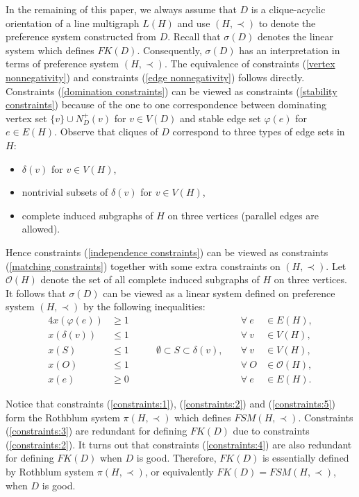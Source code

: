 \documentclass[11pt]{article}
\numberwithin{theorem}{section}
\begin{document}
In the remaining of this paper, we always assume that $D$ is a clique-acyclic orientation of a line multigraph $L(H)$ and use $(H,\prec)$ to denote the preference system constructed from $D$. Recall that $\sigma(D)$ denotes the linear system which defines $FK(D)$. Consequently, $\sigma(D)$ has an interpretation in terms of preference system $(H,\prec)$. The equivalence of constraints (\ref{vertex nonnegativity}) and constraints (\ref{edge nonnegativity}) follows directly. Constraints (\ref{domination constraints}) can be viewed as constraints (\ref{stability constraints}) because of the one to one correspondence between dominating vertex set $\{v\}\cup N^+_D(v)$ for $v\in V(D)$ and stable edge set $\varphi(e)$ for $e\in E(H)$.
Observe that cliques of $D$ correspond to three types of edge sets in $H$:
\begin{itemize}
\item $\delta(v)$ for $v\in V(H)$,
\item nontrivial subsets of $\delta(v)$ for $v\in V(H)$,
\item complete induced subgraphs of $H$ on three vertices (parallel edges are allowed).
\end{itemize}
Hence constraints (\ref{independence constraints}) can be viewed as constraints (\ref{matching constraints}) together with some extra constraints on $(H,\prec)$. Let $\mathcal{O}(H)$ denote the set of all complete induced subgraphs of $H$ on three vertices. It follows that $\sigma(D)$ can be viewed as a linear system defined on preference system $(H,\prec)$ by the following inequalities:
\begin{alignat}{4}
x(\varphi(e)) &\geq 1 &\qquad &\forall ~e &\in E(H),\label{constraints:1}\\
x(\delta(v)) &\leq 1 &\qquad &\forall ~v &\in V(H),\label{constraints:2}\\
x(S) &\leq 1 &\qquad \emptyset\subset S\subset \delta(v),\quad &\forall ~v&\in V(H),\label{constraints:3}\\
x(O) &\leq 1 &\qquad &\forall ~O&\in \mathcal{O}(H),\label{constraints:4}\\
x(e) &\geq 0 &\qquad &\forall ~e &\in E(H)\label{constraints:5}.
\end{alignat}

Notice that constraints (\ref{constraints:1}), (\ref{constraints:2}) and (\ref{constraints:5}) form the Rothblum system $\pi(H,\prec)$ which defines $FSM(H,\prec)$. Constraints (\ref{constraints:3}) are redundant for defining $FK(D)$ due to constraints (\ref{constraints:2}). It turns out that constraints (\ref{constraints:4}) are also redundant for defining $FK(D)$ when $D$ is good. Therefore, $FK(D)$ is essentially defined by Rothblum system $\pi(H,\prec)$, or equivalently $FK(D)=FSM(H,\prec)$, when $D$ is good.
\end{document}
